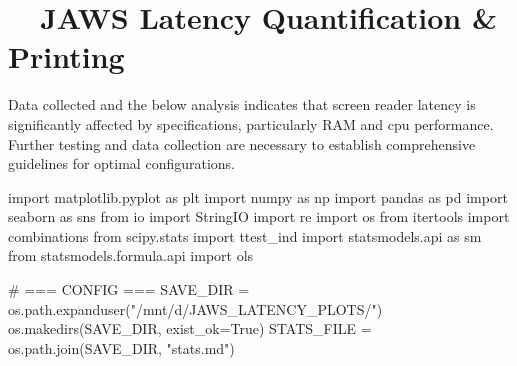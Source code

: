 \section{~~JAWS Latency Quantification \& Printing}
Data collected and the below analysis indicates that screen reader latency is significantly affected by  specifications, particularly RAM and \gls{cpu} performance. Further testing and data collection are necessary to establish comprehensive guidelines for optimal configurations.

\begin{pyverbatim}
	import matplotlib.pyplot as plt
	import numpy as np
	import pandas as pd
	import seaborn as sns
	from io import StringIO
	import re
	import os
	from itertools import combinations
	from scipy.stats import ttest_ind
	import statsmodels.api as sm
	from statsmodels.formula.api import ols

	# === CONFIG ===
	SAVE_DIR = os.path.expanduser("/mnt/d/JAWS_LATENCY_PLOTS/")
	os.makedirs(SAVE_DIR, exist_ok=True)
	STATS_FILE = os.path.join(SAVE_DIR, "stats.md")


\end{pyverbatim}
